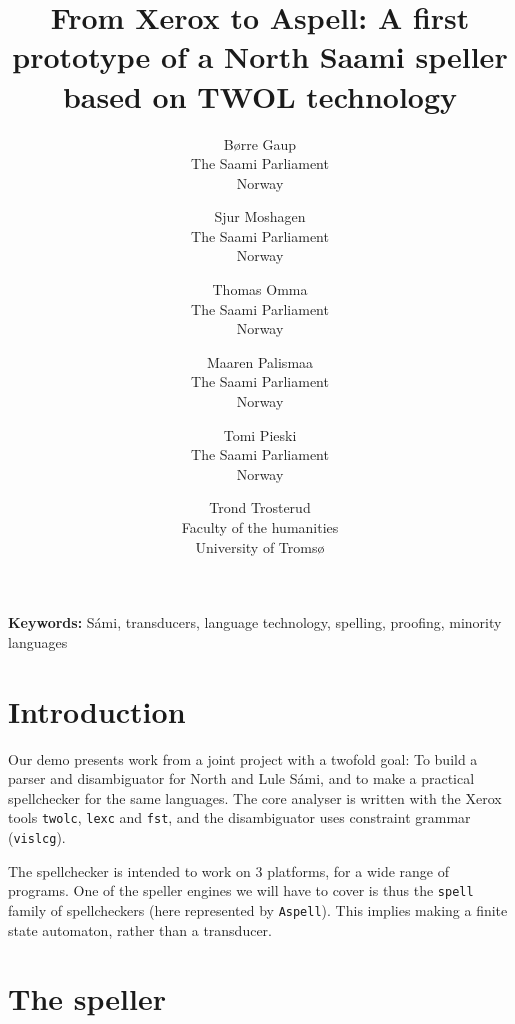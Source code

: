 \documentclass[a4paper,english]{article}
\begin{document}
\title{From Xerox to Aspell: A first prototype of a North Saami speller
 based on TWOL technology}


\author{Børre Gaup\\ The Saami Parliament\\ Norway
\and Sjur Moshagen\\ The Saami Parliament\\ Norway
\and Thomas Omma\\ The Saami Parliament\\ Norway
\and Maaren Palismaa\\ The Saami Parliament\\ Norway
\and Tomi Pieski\\ The Saami Parliament\\ Norway
\and Trond Trosterud\\ Faculty of the humanities\\ University of Tromsø}

\maketitle

\textbf{Keywords:} Sámi, transducers, language technology, spelling,
 proofing, minority languages

\section{Introduction}

Our demo presents work from a joint project with a twofold goal: To build a parser and disambiguator for North and Lule Sámi, and to make a practical spellchecker for the same languages. The core analyser is written with the Xerox tools \texttt{twolc}, \texttt{lexc} and \texttt{fst}, and the disambiguator uses constraint grammar (\texttt{vislcg}).

The spellchecker is intended to work on 3 platforms, for a wide range of programs. One of the speller engines we will have to cover is thus the \texttt{spell} family of spellcheckers (here represented by \texttt{Aspell}). This implies making a finite state automaton, rather than a transducer.

\section{The speller}
\end{document}
